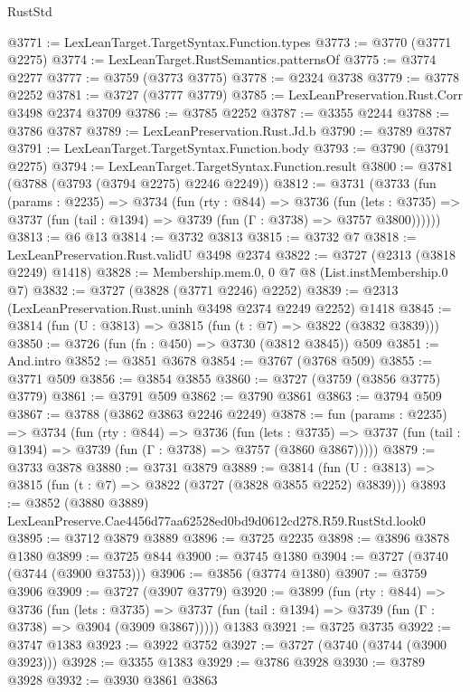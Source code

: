 \begin{lexlean}{RustStd}
\begin{coremodule}
@3771 := LexLeanTarget.TargetSyntax.Function.types
@3773 := @3770 (@3771 @2275)
@3774 := LexLeanTarget.RustSemantics.patternsOf
@3775 := @3774 @2277
@3777 := @3759 (@3773 @3775)
@3778 := @2324 @3738
@3779 := @3778 @2252
@3781 := @3727 (@3777 @3779)
@3785 := LexLeanPreservation.Rust.Corr @3498 @2374 @3709
@3786 := @3785 @2252
@3787 := @3355 @2244
@3788 := @3786 @3787
@3789 := LexLeanPreservation.Rust.Jd.b
@3790 := @3789 @3787
@3791 := LexLeanTarget.TargetSyntax.Function.body
@3793 := @3790 (@3791 @2275)
@3794 := LexLeanTarget.TargetSyntax.Function.result
@3800 := @3781 (@3788 (@3793 (@3794 @2275) @2246 @2249))
@3812 := @3731
    (@3733
      (fun (params : @2235) =>
      @3734
        (fun (rty : @844) =>
        @3736
          (fun (lets : @3735) =>
          @3737 (fun (tail : @1394) => @3739 (fun (Γ : @3738) => @3757 @3800))))))
@3813 := @6 @13
@3814 := @3732 @3813
@3815 := @3732 @7
@3818 := LexLeanPreservation.Rust.validU @3498 @2374
@3822 := @3727 (@2313 (@3818 @2249) @1418)
@3828 := Membership.mem.{0, 0} @7 @8 (List.instMembership.{0} @7)
@3832 := @3727 (@3828 (@3771 @2246) @2252)
@3839 := @2313 (LexLeanPreservation.Rust.uninh @3498 @2374 @2249 @2252) @1418
@3845 := @3814 (fun (U : @3813) => @3815 (fun (t : @7) => @3822 (@3832 @3839)))
@3850 := @3726 (fun (fn : @450) => @3730 (@3812 @3845)) @509
@3851 := And.intro
@3852 := @3851 @3678
@3854 := @3767 (@3768 @509)
@3855 := @3771 @509
@3856 := @3854 @3855
@3860 := @3727 (@3759 (@3856 @3775) @3779)
@3861 := @3791 @509
@3862 := @3790 @3861
@3863 := @3794 @509
@3867 := @3788 (@3862 @3863 @2246 @2249)
@3878 := fun (params : @2235) =>
  @3734
    (fun (rty : @844) =>
    @3736
      (fun (lets : @3735) =>
      @3737 (fun (tail : @1394) => @3739 (fun (Γ : @3738) => @3757 (@3860 @3867)))))
@3879 := @3733 @3878
@3880 := @3731 @3879
@3889 := @3814 (fun (U : @3813) => @3815 (fun (t : @7) => @3822 (@3727 (@3828 @3855 @2252) @3839)))
@3893 := @3852 (@3880 @3889) LexLeanPreserve.Cae4456d77aa62528ed0bd9d0612cd278.R59.RustStd.look0
@3895 := @3712 @3879 @3889
@3896 := @3725 @2235
@3898 := @3896 @3878 @1380
@3899 := @3725 @844
@3900 := @3745 @1380
@3904 := @3727 (@3740 (@3744 (@3900 @3753)))
@3906 := @3856 (@3774 @1380)
@3907 := @3759 @3906
@3909 := @3727 (@3907 @3779)
@3920 := @3899
    (fun (rty : @844) =>
    @3736
      (fun (lets : @3735) =>
      @3737 (fun (tail : @1394) => @3739 (fun (Γ : @3738) => @3904 (@3909 @3867)))))
    @1383
@3921 := @3725 @3735
@3922 := @3747 @1383
@3923 := @3922 @3752
@3927 := @3727 (@3740 (@3744 (@3900 @3923)))
@3928 := @3355 @1383
@3929 := @3786 @3928
@3930 := @3789 @3928
@3932 := @3930 @3861 @3863

\end{coremodule}
\end{lexlean}
